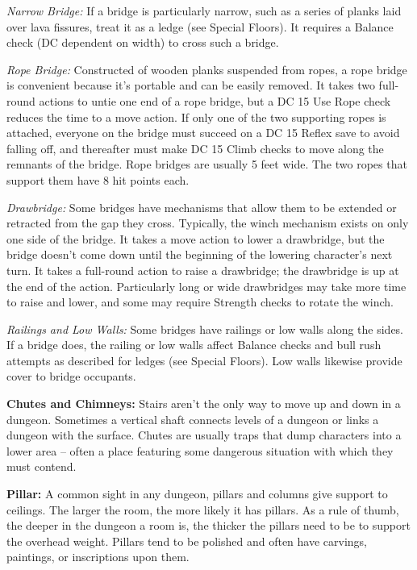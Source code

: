\textit{Narrow Bridge:} If a bridge is particularly narrow, such as a series of planks laid over lava fissures, treat it as a ledge (see Special Floors). It requires a Balance check (DC dependent on width) to cross such a bridge.

\textit{Rope Bridge:} Constructed of wooden planks suspended from ropes, a rope bridge is convenient because it's portable and can be easily removed. It takes two full-round actions to untie one end of a rope bridge, but a DC 15 Use Rope check reduces the time to a move action. If only one of the two supporting ropes is attached, everyone on the bridge must succeed on a DC 15 Reflex save to avoid falling off, and thereafter must make DC 15 Climb checks to move along the remnants of the bridge. Rope bridges are usually 5 feet wide. The two ropes that support them have 8 hit points each.

\textit{Drawbridge:} Some bridges have mechanisms that allow them to be extended or retracted from the gap they cross. Typically, the winch mechanism exists on only one side of the bridge. It takes a move action to lower a drawbridge, but the bridge doesn't come down until the beginning of the lowering character's next turn. It takes a full-round action to raise a drawbridge; the drawbridge is up at the end of the action. Particularly long or wide drawbridges may take more time to raise and lower, and some may require Strength checks to rotate the winch.

\textit{Railings and Low Walls:} Some bridges have railings or low walls along the sides. If a bridge does, the railing or low walls affect Balance checks and bull rush attempts as described for ledges (see Special Floors). Low walls likewise provide cover to bridge occupants.

\textbf{Chutes and Chimneys:} Stairs aren't the only way to move up and down in a dungeon. Sometimes a vertical shaft connects levels of a dungeon or links a dungeon with the surface. Chutes are usually traps that dump characters into a lower area -- often a place featuring some dangerous situation with which they must contend.

\textbf{Pillar:} A common sight in any dungeon, pillars and columns give support to ceilings. The larger the room, the more likely it has pillars. As a rule of thumb, the deeper in the dungeon a room is, the thicker the pillars need to be to support the overhead weight. Pillars tend to be polished and often have carvings, paintings, or inscriptions upon them. 

